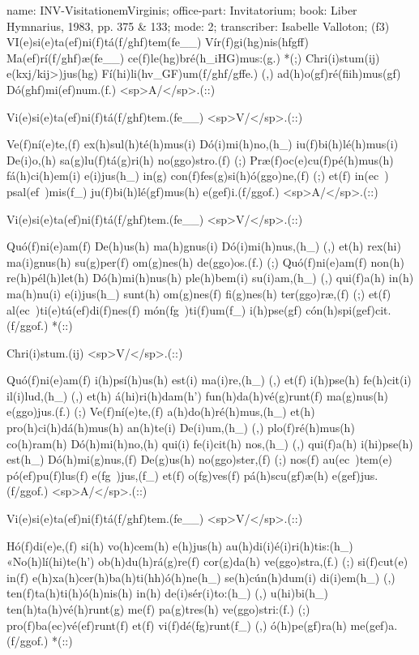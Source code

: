 name: INV-VisitationemVirginis;
office-part: Invitatorium;
book: Liber Hymnarius, 1983, pp. 375 & 133;
mode: 2;
transcriber: Isabelle Valloton;
(f3)
VI(e)si(e)ta(ef)ni(f)tá(f/ghf)tem(fe__) Vír(f)gi(hg)nis(hfgff) Ma(ef)rí(f/ghf)æ(fe__) ce(f)le(hg)bré(h_iHG)mus:(g.) *(;)
Chri(i)stum(ij) e(kxj/kij>)jus(hg) Fí(hi)li(hv_GF)um(f/ghf/gffe.) (,)
ad(h)o(gf)ré(fiih)mus(gf) Dó(ghf)mi(ef)num.(f.) <sp>A/</sp>.(::)

Vi(e)si(e)ta(ef)ni(f)tá(f/ghf)tem.(fe__) <sp>V/</sp>.(::)

Ve(f)ní(e)te,(f) ex(h)sul(h)té(h)mus(i) Dó(i)mi(h)no,(h_)
iu(f)bi(h)lé(h)mus(i) De(i)o,(h) sa(g)lu(f)tá(g)ri(h) no(ggo)stro.(f) (;)
Præ(f)oc(e)cu(f)pé(h)mus(h) fá(h)ci(h)em(i) e(i)jus(h_) 
in(g) con(f)fes(g)si(h)ó(ggo)ne,(f) (;)
et(f) in(ec~) psal(ef~)mis(f_)
ju(f)bi(h)lé(gf)mus(h) e(gef)i.(f/ggof.) <sp>A/</sp>.(::)

Vi(e)si(e)ta(ef)ni(f)tá(f/ghf)tem.(fe__) <sp>V/</sp>.(::)

Quó(f)ni(e)am(f) De(h)us(h) ma(h)gnus(i) Dó(i)mi(h)nus,(h_) (,)
et(h) rex(hi) ma(i)gnus(h) su(g)per(f) om(g)nes(h) de(ggo)os.(f.) (;)
Quó(f)ni(e)am(f) non(h) re(h)pél(h)let(h) Dó(h)mi(h)nus(h) ple(h)bem(i) su(i)am,(h_) (,)
qui(f)a(h) in(h) ma(h)nu(i) e(i)jus(h_)
sunt(h) om(g)nes(f) fi(g)nes(h) ter(ggo)ræ,(f) (;)
et(f) al(ec~)ti(e)tú(ef)di(f)nes(f) món(fg~)ti(f)um(f_)
i(h)pse(gf) cón(h)spi(gef)cit.(f/ggof.) *(::)

Chri(i)stum.(ij) <sp>V/</sp>.(::)

Quó(f)ni(e)am(f) i(h)psí(h)us(h) est(i) ma(i)re,(h_) (,)
et(f) i(h)pse(h) fe(h)cit(i) il(i)lud,(h_) (,)
et(h) á(hi)ri(h)dam(h') fun(h)da(h)vé(g)runt(f) ma(g)nus(h) e(ggo)jus.(f.) (;)
Ve(f)ní(e)te,(f) a(h)do(h)ré(h)mus,(h_) et(h) pro(h)ci(h)dá(h)mus(h) an(h)te(i) De(i)um,(h_) (,)
plo(f)ré(h)mus(h) co(h)ram(h) Dó(h)mi(h)no,(h) qui(i) fe(i)cit(h) nos,(h_) (,)
qui(f)a(h) i(hi)pse(h) est(h_) Dó(h)mi(g)nus,(f) De(g)us(h) no(ggo)ster,(f) (;)
nos(f) au(ec~)tem(e) pó(ef)pu(f)lus(f) e(fg~)jus,(f_)
et(f) o(fg)ves(f) pá(h)scu(gf)æ(h) e(gef)jus.(f/ggof.) <sp>A/</sp>.(::)

Vi(e)si(e)ta(ef)ni(f)tá(f/ghf)tem.(fe__) <sp>V/</sp>.(::)

Hó(f)di(e)e,(f) si(h) vo(h)cem(h) e(h)jus(h) au(h)di(i)é(i)ri(h)tis:(h_)
«No(h)lí(hi)te(h') ob(h)du(h)rá(g)re(f) cor(g)da(h) ve(ggo)stra,(f.) (;)
si(f)cut(e) in(f) e(h)xa(h)cer(h)ba(h)ti(hh)ó(h)ne(h_) se(h)cún(h)dum(i) di(i)em(h_) (,)
ten(f)ta(h)ti(h)ó(h)nis(h) in(h) de(i)sér(i)to:(h_) (,)
u(hi)bi(h_) ten(h)ta(h)vé(h)runt(g) me(f) pa(g)tres(h) ve(ggo)stri:(f.) (;)
pro(f)ba(ec)vé(ef)runt(f) et(f) vi(f)dé(fg)runt(f_) (,)
ó(h)pe(gf)ra(h) me(gef)a.(f/ggof.) *(::)

